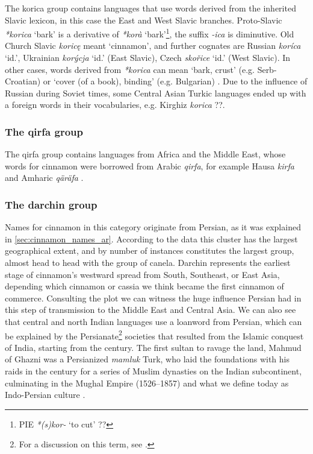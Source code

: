 The korica group contains languages that use words derived from the inherited Slavic lexicon, in this case the East and West Slavic branches. Proto-Slavic \textit{*korica} `bark' is a derivative of \textit{*korà} `bark'\footnote{\gls{PIE} \textit{*(s)kor-} `to cut' ??}, the suffix \textit{-ica} is diminutive. Old Church Slavic \textit{koricę} meant `cinnamon', and further cognates are Russian \textit{koríca} `id.', Ukrainian  \textit{korýcja} `id.' (East Slavic), Czech \textit{skořice} `id.' (West Slavic). In other cases, words derived from \textit{*korica} can mean `bark, crust' (e.g. Serb-Croatian) or `cover (of a book), binding' (e.g. Bulgarian) \autocite[235]{derksen_etymological_2008}. Due to the influence of Russian during Soviet times, some Central Asian Turkic languages ended up with a foreign words in their vocabularies, e.g. Kirghiz  \textit{korica} ??.

\subsubsection{The qirfa group}

The qirfa group contains languages from Africa and the Middle East, whose words for cinnamon were borrowed from Arabic \textit{qirfa}, for example Hausa \textit{kirfa} \autocite[114]{newman_hausa-english_2007} and Amharic  \textit{qäräfa} \autocite[74]{leslau_concise_1996}.

\subsubsection{The darchin group}

Names for cinnamon in this category originate from Persian, as it was explained in \cref{sec:cinnamon_names_ar}. According to the data this cluster has the largest geographical extent, and by number of instances constitutes the largest group, almost head to head with the group of canela. Darchin represents the earliest stage of cinnamon's westward spread from South, Southeast, or East Asia, depending which cinnamon or cassia we think became the first cinnamon of commerce. Consulting the plot we can witness the huge influence Persian had in this step of transmission to the Middle East and Central Asia. We can also see that central and north Indian languages use a loanword from Persian, which can be explained by the Persianate\footnote{For a discussion on this term, see \textcite{green_persianate_2019}.} societies that resulted from the Islamic conquest of India, starting from the  century. The first sultan to ravage the land, Mahmud of Ghazni was a Persianized \textit{mamluk} Turk, who laid the foundations with his raids in the  century for a series of Muslim dynasties on the Indian subcontinent, culminating in the Mughal Empire (1526–1857) and what we define today as Indo-Persian culture \autocite[33]{eaton_india_2019}.

